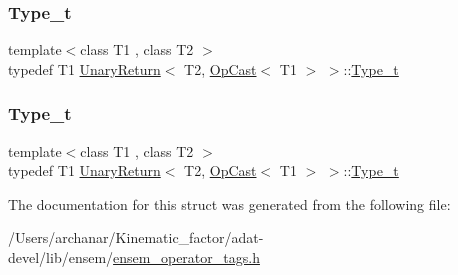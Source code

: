 \mbox{\label{structUnaryReturn_3_01T2_00_01OpCast_3_01T1_01_4_01_4_a2783d52a76cad88255fd0cdbca603ebc}} 
\subsubsection{\texorpdfstring{Type\_t}{Type\_t}\hspace{0.1cm}{\footnotesize\ttfamily [2/3]}}
{\footnotesize\ttfamily template$<$class T1 , class T2 $>$ \\
typedef T1 \mbox{\hyperlink{structUnaryReturn}{Unary\+Return}}$<$ T2, \mbox{\hyperlink{structOpCast}{Op\+Cast}}$<$ T1 $>$ $>$\+::\mbox{\hyperlink{structUnaryReturn_3_01T2_00_01OpCast_3_01T1_01_4_01_4_a2783d52a76cad88255fd0cdbca603ebc}{Type\+\_\+t}}}

\mbox{\label{structUnaryReturn_3_01T2_00_01OpCast_3_01T1_01_4_01_4_a2783d52a76cad88255fd0cdbca603ebc}} 
\subsubsection{\texorpdfstring{Type\_t}{Type\_t}\hspace{0.1cm}{\footnotesize\ttfamily [3/3]}}
{\footnotesize\ttfamily template$<$class T1 , class T2 $>$ \\
typedef T1 \mbox{\hyperlink{structUnaryReturn}{Unary\+Return}}$<$ T2, \mbox{\hyperlink{structOpCast}{Op\+Cast}}$<$ T1 $>$ $>$\+::\mbox{\hyperlink{structUnaryReturn_3_01T2_00_01OpCast_3_01T1_01_4_01_4_a2783d52a76cad88255fd0cdbca603ebc}{Type\+\_\+t}}}



The documentation for this struct was generated from the following file\+:\begin{DoxyCompactItemize}
\item 
/\+Users/archanar/\+Kinematic\+\_\+factor/adat-\/devel/lib/ensem/\mbox{\hyperlink{adat-devel_2lib_2ensem_2ensem__operator__tags_8h}{ensem\+\_\+operator\+\_\+tags.\+h}}\end{DoxyCompactItemize}
